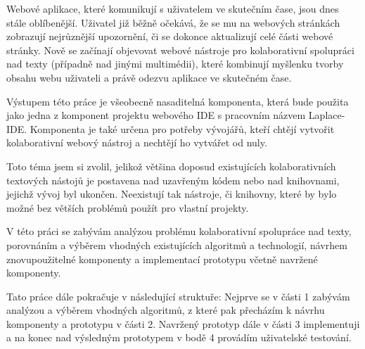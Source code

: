 \begin{introduction}

    Webové aplikace, které komunikují s uživatelem ve skutečním čase, jsou dnes stále oblíbenější.
    Uživatel již běžně očekává, že se mu na webových stránkách zobrazují nejrůznější upozornění, či se dokonce aktualizují celé části webové stránky.
    Nově se začínají objevovat webové nástroje pro kolaborativní spolupráci nad texty (případně nad jinými multimédii), které kombinují myšlenku tvorby obsahu webu uživateli a právě odezvu aplikace ve skutečném čase.

    Výstupem této práce je všeobecně nasaditelná komponenta, která bude použita jako jedna z komponent projektu webového IDE s pracovním názvem Laplace-IDE.
    Komponenta je také určena pro potřeby vývojářů, kteří chtějí vytvořit kolaborativní webový nástroj a nechtějí ho vytvářet od nuly.

    Toto téma jsem si zvolil, jelikož většina doposud existujících kolaborativních textových nástojů je postavena nad uzavřeným kódem nebo nad knihovnami, jejichž vývoj byl ukončen.
    Neexistují tak nástroje, či knihovny, které by bylo možné bez větších problémů použít pro vlastní projekty.

    V této práci se zabývám analýzou problému kolaborativní spolupráce nad texty, porovnáním a výběrem vhodných existujících algoritmů a technologií, návrhem znovupoužitelné komponenty a implementací prototypu včetně navržené komponenty.

    Tato práce dále pokračuje v následující struktuře:
    Nejprve se v části 1 zabývám analýzou a výběrem vhodných algoritmů, z které pak přecházím k návrhu komponenty a prototypu v části 2.
    Navržený prototyp dále v části 3 implementuji a na konec nad výsledným prototypem v bodě 4 provádím uživatelské testování.

\end{introduction}